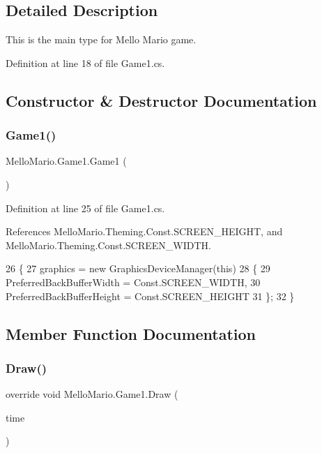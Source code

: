 \subsection{Detailed Description}
This is the main type for Mello Mario game. 



Definition at line 18 of file Game1.\+cs.



\subsection{Constructor \& Destructor Documentation}
\mbox{\label{classMelloMario_1_1Game1_af9eac36e9eb845c660d3db4679d58b05}} 
\subsubsection{Game1()}
{\footnotesize\ttfamily Mello\+Mario.\+Game1.\+Game1 (\begin{DoxyParamCaption}{ }\end{DoxyParamCaption})}



Definition at line 25 of file Game1.\+cs.



References Mello\+Mario.\+Theming.\+Const.\+S\+C\+R\+E\+E\+N\+\_\+\+H\+E\+I\+G\+HT, and Mello\+Mario.\+Theming.\+Const.\+S\+C\+R\+E\+E\+N\+\_\+\+W\+I\+D\+TH.


\begin{DoxyCode}
26         \{
27             graphics = \textcolor{keyword}{new} GraphicsDeviceManager(\textcolor{keyword}{this})
28             \{
29                 PreferredBackBufferWidth = Const.SCREEN\_WIDTH,
30                 PreferredBackBufferHeight = Const.SCREEN\_HEIGHT
31             \};
32         \}
\end{DoxyCode}


\subsection{Member Function Documentation}
\mbox{\label{classMelloMario_1_1Game1_acf83ef72d18163996d51454769a2dcfd}} 
\subsubsection{Draw()}
{\footnotesize\ttfamily override void Mello\+Mario.\+Game1.\+Draw (\begin{DoxyParamCaption}\item[{Game\+Time}]{time }\end{DoxyParamCaption})\hspace{0.3cm}{\ttfamily [protected]}}



